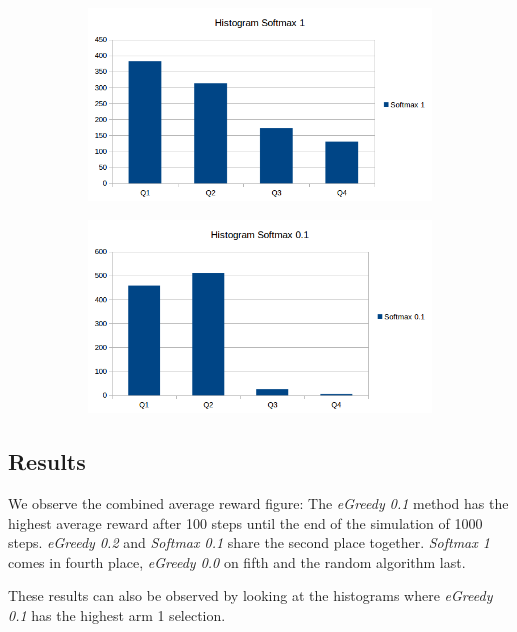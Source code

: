 \documentclass[a4paper, 11pt]{article}
\begin{document}
\begin{figure}[H]
\begin{subfigure}{.5\textwidth}
  \centering
  \includegraphics[width=1\linewidth]{ex1_histogram_softmax1}
\end{subfigure}%
\begin{subfigure}{.5\textwidth}
  \centering
  \includegraphics[width=1\linewidth]{ex1_histogram_softmax01}
\end{subfigure}%
\end{figure}


\subsection{Results}

We observe the combined average reward figure: The \textit{eGreedy 0.1} method has the highest average reward after 100 steps until the end of the simulation of 1000 steps. \textit{eGreedy 0.2} and \textit{Softmax 0.1} share the second place together. \textit{Softmax 1} comes in fourth place, \textit{eGreedy 0.0} on fifth and the random algorithm last.

These results can also be observed by looking at the histograms where \textit{eGreedy 0.1} has the highest arm 1 selection.
\end{document}
